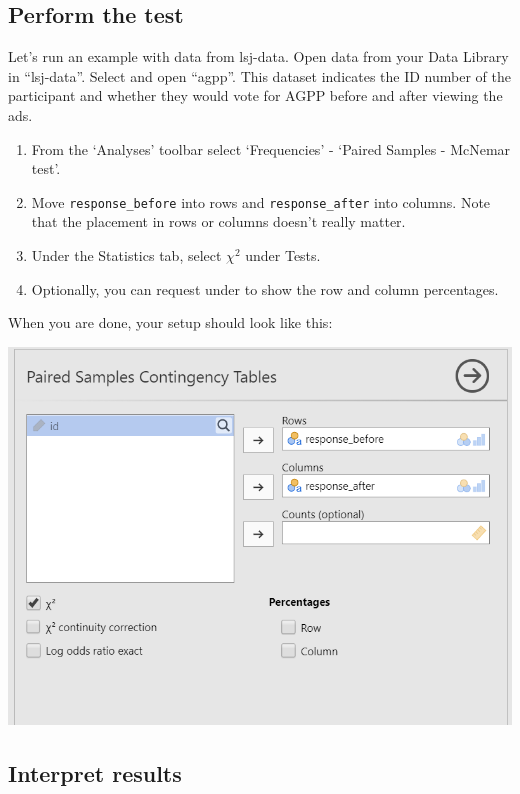 \documentclass[
]{book}
\begin{document}
\hypertarget{perform-the-test-5}{%
\subsection{Perform the test}\label{perform-the-test-5}}

Let's run an example with data from lsj-data. Open data from your Data Library in ``lsj-data''. Select and open ``agpp''. This dataset indicates the ID number of the participant and whether they would vote for AGPP before and after viewing the ads.

\begin{enumerate}
\def\labelenumi{\arabic{enumi}.}
\item
  From the `Analyses' toolbar select `Frequencies' - `Paired Samples - McNemar test'.
\item
  Move \texttt{response\_before} into rows and \texttt{response\_after} into columns. Note that the placement in rows or columns doesn't really matter.
\item
  Under the Statistics tab, select \(\chi^2\) under Tests.
\item
  Optionally, you can request under to show the row and column percentages.
\end{enumerate}

When you are done, your setup should look like this:

\includegraphics{images/12-mcnemar/mcnemar_setup.png}

\hypertarget{interpret-results-3}{%
\subsection{Interpret results}\label{interpret-results-3}}
\end{document}
